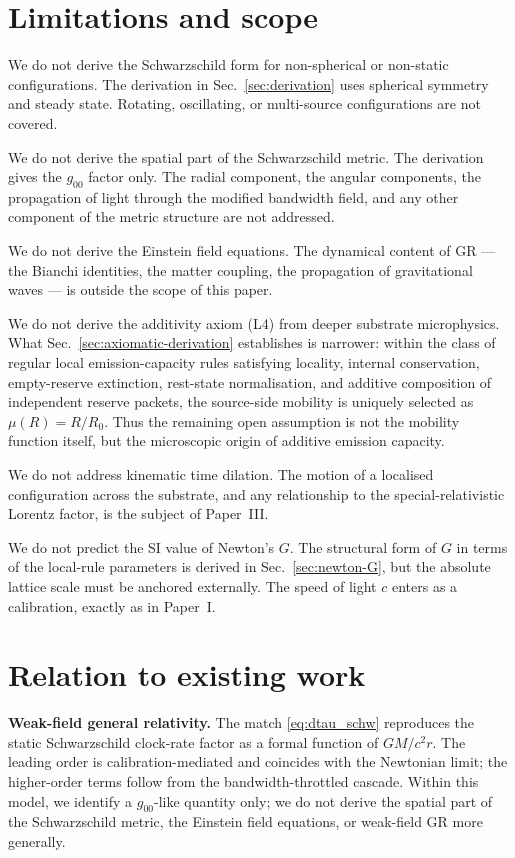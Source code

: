 \documentclass[11pt,a4paper]{article}
\begin{document}
\section{Limitations and scope}
\label{sec:not}

We do not derive the Schwarzschild form for non-spherical or
non-static configurations. The derivation in
Sec.~\ref{sec:derivation} uses spherical symmetry and steady
state. Rotating, oscillating, or multi-source configurations
are not covered.

We do not derive the spatial part of the Schwarzschild metric.
The derivation gives the $g_{00}$ factor only. The radial
component, the angular components, the propagation of light
through the modified bandwidth field, and any other component
of the metric structure are not addressed.

We do not derive the Einstein field equations. The dynamical
content of GR --- the Bianchi identities, the matter coupling,
the propagation of gravitational waves --- is outside the
scope of this paper.

We do not derive the additivity axiom (L4) from deeper
substrate microphysics. What
Sec.~\ref{sec:axiomatic-derivation} establishes is narrower:
within the class of regular local emission-capacity rules
satisfying locality, internal conservation, empty-reserve
extinction, rest-state normalisation, and additive composition
of independent reserve packets, the source-side mobility is
uniquely selected as $\mu(R) = R/R_0$. Thus the remaining open
assumption is not the mobility function itself, but the
microscopic origin of additive emission capacity.

We do not address kinematic time dilation. The motion of a
localised configuration across the substrate, and any
relationship to the special-relativistic Lorentz factor, is
the subject of Paper~III.

We do not predict the SI value of Newton's $G$. The structural
form of $G$ in terms of the local-rule parameters is derived
in Sec.~\ref{sec:newton-G}, but the absolute lattice scale must
be anchored externally. The speed of light $c$ enters as a
calibration, exactly as in Paper~I.

\section{Relation to existing work}
\label{sec:related}

\textbf{Weak-field general relativity.} The match
\eqref{eq:dtau_schw} reproduces the static Schwarzschild
clock-rate factor as a formal function of $GM/c^2 r$. The
leading order is calibration-mediated and coincides with the
Newtonian limit; the higher-order terms follow from the
bandwidth-throttled cascade. Within this model, we identify a
$g_{00}$-like quantity only; we do not derive the spatial part
of the Schwarzschild metric, the Einstein field equations, or
weak-field GR more generally.
\end{document}
